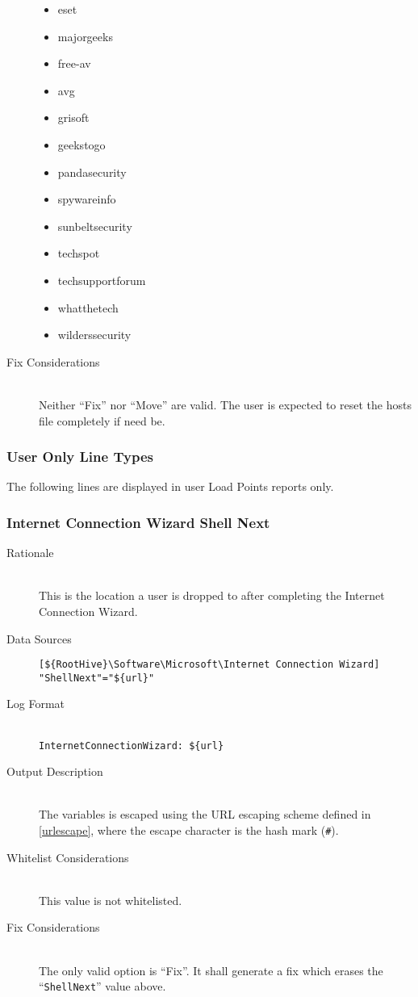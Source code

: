 \begin{description}
\begin{itemize}
  \item eset
  \item majorgeeks
  \item free-av
  \item avg
  \item grisoft
  \item geekstogo
  \item pandasecurity
  \item spywareinfo
  \item sunbeltsecurity
  \item techspot
  \item techsupportforum
  \item whatthetech
  \item wilderssecurity
\end{itemize}
\item[Fix Considerations] \hfill \\
Neither ``Fix'' nor ``Move'' are valid. The user is expected to reset the hosts
file completely if need be.
\end{description}

\subsubsection{User Only Line Types}
The following lines are displayed in user Load Points reports only.

\subsubsection{Internet Connection Wizard Shell Next}
\begin{description}
\item[Rationale] \hfill \\
This is the location a user is dropped to after completing the Internet
Connection Wizard.
\item[Data Sources] \hfill
\vspace{-\baselineskip}
\begin{verbatim}
[${RootHive}\Software\Microsoft\Internet Connection Wizard]
"ShellNext"="${url}"
\end{verbatim}
\item[Log Format] \hfill \\
\verb|InternetConnectionWizard: ${url}|
\item[Output Description] \hfill \\
The variables  is escaped using the URL escaping
scheme defined in \ref{urlescape}, where the escape character is the hash mark
(\verb|#|).
\item[Whitelist Considerations] \hfill \\
This value is not whitelisted.
\item[Fix Considerations] \hfill \\
The only valid option is ``Fix''. It shall generate a fix which erases the
``\verb|ShellNext|'' value above.
\end{description}

